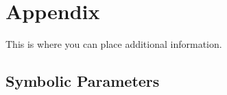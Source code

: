 \documentclass[12pt, titlepage]{article}
\begin{document}


					
					
					
					
					

					
					
					
					







				
% 

% 

\newpage

\section{Appendix}

This is where you can place additional information.

\subsection{Symbolic Parameters}
\end{document}
